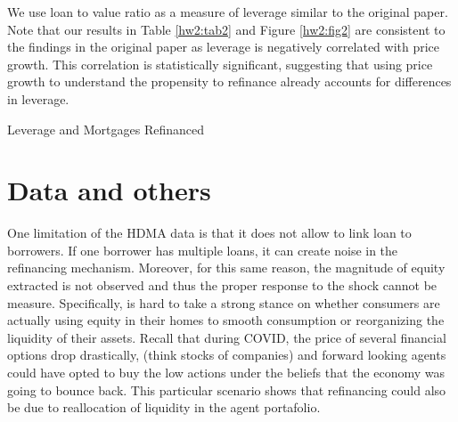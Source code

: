 \documentclass[11pt]{article}
\begin{document}
\FloatBarrier
We use loan to value ratio as a measure of leverage similar to the original paper. Note that our results in Table \ref{hw2:tab2} and Figure \ref{hw2:fig2} are consistent to the findings in the original paper as leverage is negatively correlated with price growth. This correlation is statistically significant, suggesting that using price growth to understand the propensity to refinance already accounts for differences in leverage. 
\begin{table}[htb]
    \centering
    \caption{Leverage and Mortgages Refinanced}
    \label{hw2:tab2}
    \small{
    
    }
\end{table}

\section{Data and others}
One limitation of the HDMA data is that it does not allow to link loan to borrowers. If one borrower has multiple loans, it can create noise in the refinancing mechanism. Moreover, for this same reason, the magnitude of equity extracted is not observed and thus the proper response to the shock cannot be measure. Specifically, is hard to take a strong stance on whether consumers are actually using equity in their homes to smooth consumption or reorganizing the liquidity of their assets. Recall that during COVID, the price of several financial options drop drastically, (think stocks of companies) and forward looking agents could have opted to buy the low actions under the beliefs that the economy was going to bounce back. This particular scenario shows that refinancing could also be due to reallocation of liquidity in the agent portafolio. 
\end{document}
